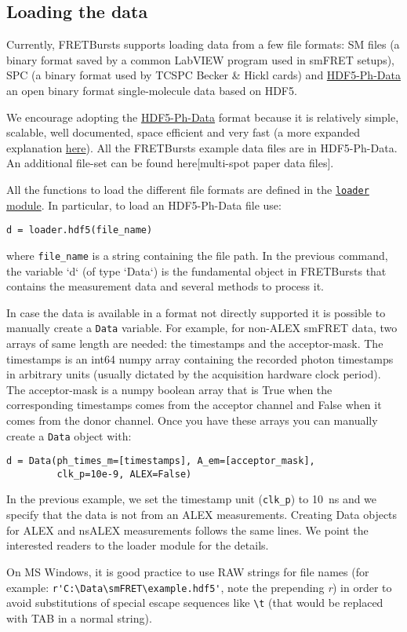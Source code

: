 \subsection{Loading the data}
Currently, FRETBursts supports loading data from a few file formats: SM files (a binary format saved by a common LabVIEW program used in smFRET setups), SPC (a binary format used by TCSPC Becker \& Hickl cards) and \href{https://github.com/tritemio/FRETBursts/wiki/HDF5-Ph-Data-format-0.2-Draft}{HDF5-Ph-Data}  an open binary format single-molecule data based on HDF5.

We encourage adopting the \href{https://github.com/tritemio/FRETBursts/wiki/HDF5-Ph-Data-format-0.2-Draft}{HDF5-Ph-Data} format because it is relatively simple, scalable, well documented, space efficient and very fast (a more expanded explanation \href{http://fretbursts.readthedocs.org/en/latest/HDF5_format.html}{here}). All the FRETBursts example data files are in HDF5-Ph-Data. An additional file-set can be found here[multi-spot paper data files].

All the functions to load the different file formats are defined in the \href{http://fretbursts.readthedocs.org/en/latest/loader.html}{\texttt{loader} module}. In particular, to load an HDF5-Ph-Data file use:

\begin{verbatim}
d = loader.hdf5(file_name)
\end{verbatim}

where \verb|file_name| is a string containing the file path. In the previous command, the variable `d` (of type `Data`) is the fundamental object in FRETBursts that contains the measurement data and several methods to process it.

In case the data is available in a format not directly supported it is possible to manually create a \verb|Data| variable. For example, for non-ALEX smFRET data, two arrays of same length are needed: the timestamps and the acceptor-mask. The timestamps is an int64 numpy array containing the recorded photon timestamps in arbitrary units (usually dictated by the acquisition hardware clock period). The acceptor-mask is a numpy boolean array that is True when the corresponding timestamps comes from the acceptor channel and False when it comes from the donor channel. Once you have these arrays you can manually create a \verb|Data| object with:

\begin{verbatim}
d = Data(ph_times_m=[timestamps], A_em=[acceptor_mask], 
         clk_p=10e-9, ALEX=False)
\end{verbatim}

In the previous example, we set the timestamp unit (\verb|clk_p|) to 10~ns and we specify that the data is not from an ALEX measurements. Creating Data objects for ALEX and nsALEX measurements follows the same lines. We point the interested readers to the loader module for the details.

On MS Windows, it is good practice to use RAW strings for file names (for example: \verb|r'C:\Data\smFRET\example.hdf5'|, note the prepending \textit{r}) in order to avoid substitutions of special escape sequences like \verb|\t| (that would be replaced with TAB in a normal string).
